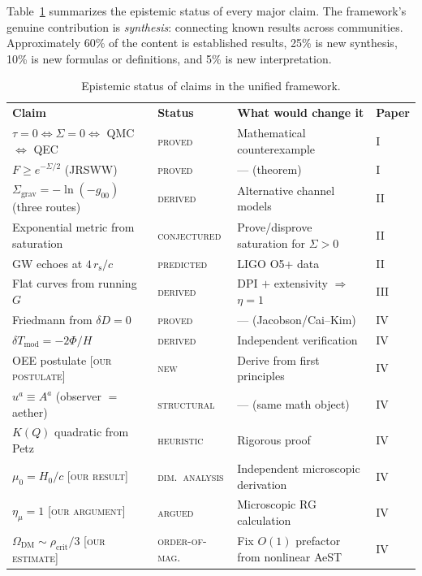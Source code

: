 \documentclass[prd,twocolumn,superscriptaddress,longbibliography,floatfix]{revtex4-2}
\newcommand{\tauasym}{\tau}
\newcommand{\rs}{r_{\mathrm{s}}}
\newcommand{\Sgrav}{\Sigma_{\mathrm{grav}}}
\newcommand{\Tmod}{T_{\mathrm{mod}}}
\newcommand{\OmDM}{\Omega_{\mathrm{DM}}}
\begin{document}
Table~\ref{tab:honest} summarizes the epistemic status of
every major claim.  The framework's genuine contribution is
\emph{synthesis}: connecting known results across communities.
Approximately 60\% of the content is established results,
25\% is new synthesis, 10\% is new formulas or definitions,
and 5\% is new interpretation.

\begin{table}[t]
\caption{\label{tab:honest}Epistemic status of claims in
the unified framework.}
\begin{ruledtabular}
\begin{tabular}{llll}
\textbf{Claim} &
\textbf{Status} &
\textbf{What would change it} &
\textbf{Paper} \\
\colrule
$\tauasym = 0 \Leftrightarrow \Sigma = 0
\Leftrightarrow$ QMC $\Leftrightarrow$ QEC
& \textsc{proved} & Mathematical counterexample & I \\
$F \geq e^{-\Sigma/2}$ (JRSWW)
& \textsc{proved} & --- (theorem) & I \\
$\Sgrav = -\ln(-g_{00})$ (three routes)
& \textsc{derived} & Alternative channel models & II \\
Exponential metric from saturation
& \textsc{conjectured} & Prove/disprove saturation for $\Sigma > 0$ & II \\
GW echoes at $4\,\rs/c$
& \textsc{predicted} & LIGO O5+ data & II \\
Flat curves from running $G$
& \textsc{derived} & DPI $+$ extensivity $\Rightarrow$ $\eta=1$ & III \\
Friedmann from $\delta D = 0$
& \textsc{proved} & --- (Jacobson/Cai--Kim) & IV \\
$\delta\Tmod = -2\Phi/H$
& \textsc{derived} & Independent verification & IV \\
OEE postulate [\textsc{our postulate}]
& \textsc{new} & Derive from first principles & IV \\
$u^a \equiv A^a$ (observer $=$ aether)
& \textsc{structural} & --- (same math object) & IV \\
$K(Q)$ quadratic from Petz
& \textsc{heuristic} & Rigorous proof & IV \\
$\mu_0 = H_0/c$ [\textsc{our result}]
& \textsc{dim.\ analysis} & Independent microscopic derivation & IV \\
$\eta_\mu = 1$ [\textsc{our argument}]
& \textsc{argued} & Microscopic RG calculation & IV \\
$\OmDM \sim \rho_{\mathrm{crit}}/3$ [\textsc{our estimate}]
& \textsc{order-of-mag.} & Fix $O(1)$ prefactor from nonlinear AeST & IV \\

\end{tabular}
\end{ruledtabular}
\end{table}
\end{document}

